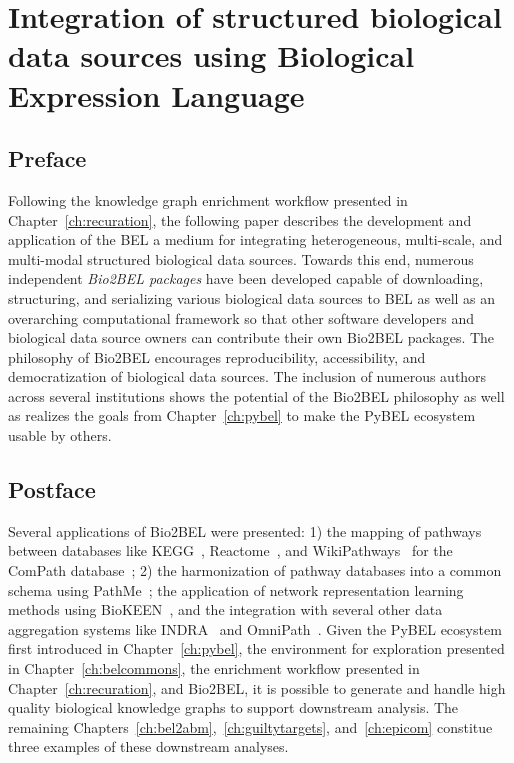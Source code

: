 \chapter{Integration of structured biological data sources using Biological Expression Language}
\label{ch:bio2bel}

\section*{Preface}

Following the knowledge graph enrichment workflow presented in Chapter~\ref{ch:recuration}, the following paper describes the development and application of the \ac{BEL} a medium for integrating heterogeneous, multi-scale, and multi-modal structured biological data sources.
Towards this end, numerous independent \textit{Bio2BEL packages} have been developed capable of downloading, structuring, and serializing various biological data sources to \ac{BEL} as well as an overarching computational framework so that other software developers and biological data source owners can contribute their own Bio2BEL packages.
The philosophy of Bio2BEL encourages reproducibility, accessibility, and democratization of biological data sources.
The inclusion of numerous authors across several institutions shows the potential of the Bio2BEL philosophy as well as realizes the goals from Chapter~\ref{ch:pybel} to make the PyBEL ecosystem usable by others.

\vspace*{\fill}



\section*{Postface}

Several applications of Bio2BEL were presented: 1) the mapping of pathways between databases like \ac{KEGG}~\cite{Kanehisa2017}, Reactome~\cite{Fabregat2016}, and WikiPathways~\cite{Slenter2018} for the ComPath database~\cite{Domingo-Fernandez2018}; 2) the harmonization of pathway databases into a common schema using PathMe~\cite{Domingo-Fernandez2019a}; the application of network representation learning methods using BioKEEN~\cite{Ali2019}, and the integration with several other data aggregation systems like \ac{INDRA}~\cite{Gyori2017} and OmniPath~\cite{Turei2016}.
Given the PyBEL ecosystem first introduced in Chapter~\ref{ch:pybel}, the environment for exploration presented in Chapter~\ref{ch:belcommons}, the enrichment workflow presented in Chapter~\ref{ch:recuration}, and Bio2BEL, it is possible to generate and handle high quality biological knowledge graphs to support downstream analysis.
The remaining Chapters~\ref{ch:bel2abm},~\ref{ch:guiltytargets}, and~\ref{ch:epicom} constitue three examples of these downstream analyses.
